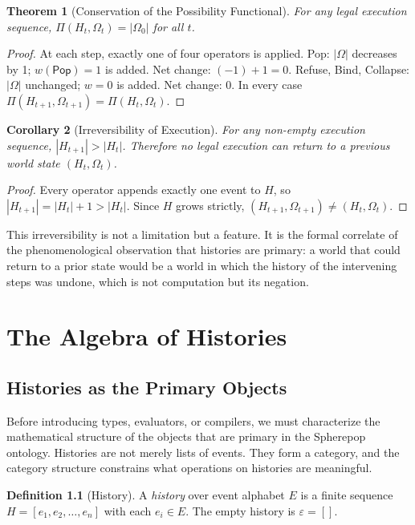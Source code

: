 \documentclass[12pt, a4paper, openany]{book}
\theoremstyle{plain}
\newtheorem{theorem}{Theorem}[chapter]
\newtheorem{corollary}[theorem]{Corollary}
\theoremstyle{definition}
\newtheorem{definition}[theorem]{Definition}
\theoremstyle{remark}
\newcommand{\Pop}{\mathsf{Pop}}
\begin{document}
\begin{theorem}[Conservation of the Possibility Functional]
For any legal execution sequence, $\Pi(H_t, \Omega_t) = |\Omega_0|$ for all $t$.
\end{theorem}

\begin{proof}
At each step, exactly one of four operators is applied. Pop: $|\Omega|$ decreases
by 1; $w(\Pop) = 1$ is added. Net change: $(-1) + 1 = 0$. Refuse, Bind, Collapse:
$|\Omega|$ unchanged; $w = 0$ is added. Net change: $0$. In every case
$\Pi(H_{t+1}, \Omega_{t+1}) = \Pi(H_t, \Omega_t)$.
\end{proof}

\begin{corollary}[Irreversibility of Execution]
For any non-empty execution sequence, $|H_{t+1}| > |H_t|$. Therefore no legal
execution can return to a previous world state $(H_t, \Omega_t)$.
\end{corollary}

\begin{proof}
Every operator appends exactly one event to $H$, so $|H_{t+1}| = |H_t| + 1 > |H_t|$.
Since $H$ grows strictly, $(H_{t+1}, \Omega_{t+1}) \neq (H_t, \Omega_t)$.
\end{proof}

This irreversibility is not a limitation but a feature. It is the formal
correlate of the phenomenological observation that histories are primary: a world
that could return to a prior state would be a world in which the history of
the intervening steps was undone, which is not computation but its negation.

\chapter{The Algebra of Histories}

\section{Histories as the Primary Objects}

Before introducing types, evaluators, or compilers, we must characterize the
mathematical structure of the objects that are primary in the Spherepop ontology.
Histories are not merely lists of events. They form a category, and the category
structure constrains what operations on histories are meaningful.

\begin{definition}[History]
A \emph{history} over event alphabet $E$ is a finite sequence
$H = [e_1, e_2, \ldots, e_n]$ with each $e_i \in E$. The empty history is
$\varepsilon = []$.
\end{definition}
\end{document}
